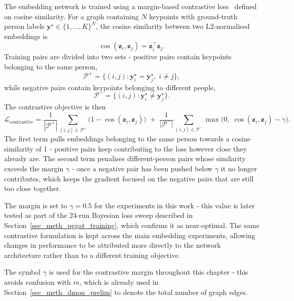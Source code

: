 The embedding network is trained using a margin-based contrastive loss~\cite{chopra2005contrastive}
defined on cosine similarity.
For a graph containing $N$ keypoints
with ground-truth person labels $\mathbf{y}^\star \in \{1,\dots,K\}^{N}$,
the cosine similarity between two L2-normalised embeddings is
\begin{equation}
    \cos(\mathbf{z}_i,\mathbf{z}_j)
    = \mathbf{z}_i^\top \mathbf{z}_j.
\end{equation}
Training pairs are divided into two sets -
positive pairs contain keypoints belonging to the same person,
\begin{equation}
    \mathcal{P}^{+}
    = \{(i,j) :
    \mathbf{y}^\star_i = \mathbf{y}^\star_j,\; i \neq j\},
\end{equation}
while negative pairs contain keypoints belonging to different people,
\begin{equation}
    \mathcal{P}^{-}
    = \{(i,j) :
    \mathbf{y}^\star_i \neq \mathbf{y}^\star_j\}.
\end{equation}
The contrastive objective is then
\begin{equation}
    \mathcal{L}_{\text{contrastive}}
    =
    \frac{1}{|\mathcal{P}^{+}|}
    \sum_{(i,j) \in \mathcal{P}^{+}}
    \bigl(
        1 - \cos(\mathbf{z}_i,\mathbf{z}_j)
    \bigr)
    \;+\;
    \frac{1}{|\mathcal{P}^{-}|}
    \sum_{(i,j) \in \mathcal{P}^{-}}
    \max\!\bigl(
        0,\;
        \cos(\mathbf{z}_i,\mathbf{z}_j) - \gamma
    \bigr).
    \label{eq:contrastive_loss}
\end{equation}
The first term pulls embeddings belonging to the same person towards a cosine similarity of 1 -
positive pairs keep contributing to the loss however close they already are.
The second term penalises different-person pairs whose similarity exceeds the margin $\gamma$ -
once a negative pair has been pushed below $\gamma$ it no longer contributes,
which keeps the gradient focused on the negative pairs that are still too close together.

The margin is set to $\gamma=0.5$ for the experiments in this work -
this value is later tested as part of the 24-run Bayesian loss sweep
described in Section~\ref{sec_meth_pggat_training},
which confirms it as near-optimal.
The same contrastive formulation is kept across the main embedding experiments,
allowing changes in performance to be attributed more directly to the network architecture
rather than to a different training objective.

The symbol $\gamma$ is used for the contrastive margin throughout this chapter -
this avoids confusion with $m$,
which is already used in Section~\ref{sec_meth_dmon_prelim} to denote the total number of graph edges.

